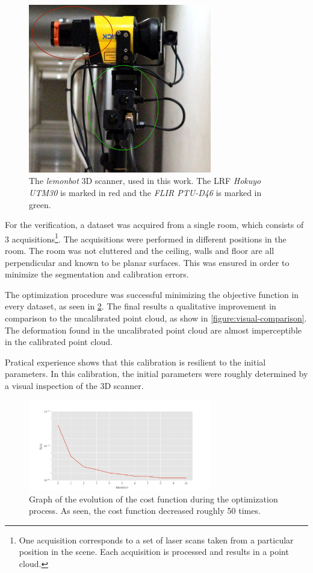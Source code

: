 \documentclass[conference]{IEEEtran}
\begin{document}
\begin{figure}[h]
    \centering
    \includegraphics[width=8cm]{images/lemonbot-head}
    \caption{The \textit{lemonbot} 3D scanner, used in this work. The LRF \textit{Hokuyo UTM30} is marked in red and the \textit{FLIR PTU-D46} is marked in green.}
    \label{figure:lemonbot}
\end{figure}

For the verification, a dataset was acquired from a single room, which consists of 3 acquisitions\footnote{One acquisition corresponds to a set of laser scans taken from a particular position in the scene. Each acquisition is processed and results in a point cloud.}. The acquisitions were performed in different positions in the room. The room was not cluttered and the ceiling, walls and floor are all perpendicular and known to be planar surfaces. This was ensured in order to minimize the segmentation and calibration errors.

The optimization procedure was successful minimizing the objective function in every dataset, as seen in \cref{table:iteration-results}. The final results a qualitative improvement in comparison to the uncalibrated point cloud, as show in \cref{figure:visual-comparison}. The deformation found in the uncalibrated point cloud are almost imperceptible in the calibrated point cloud.

Pratical experience shows that this calibration is resilient to the initial parameters. In this calibration, the initial parameters were roughly determined by a visual inspection of the 3D scanner. 

\begin{figure}
    \centering
    \includegraphics[width=8cm]{images/calibration-evolution.png}
    \caption{Graph of the evolution of the cost function during the optimization process. As seen, the cost function decreased roughly 50 times.}
    \label{table:iteration-results}
\end{figure}
\end{document}
